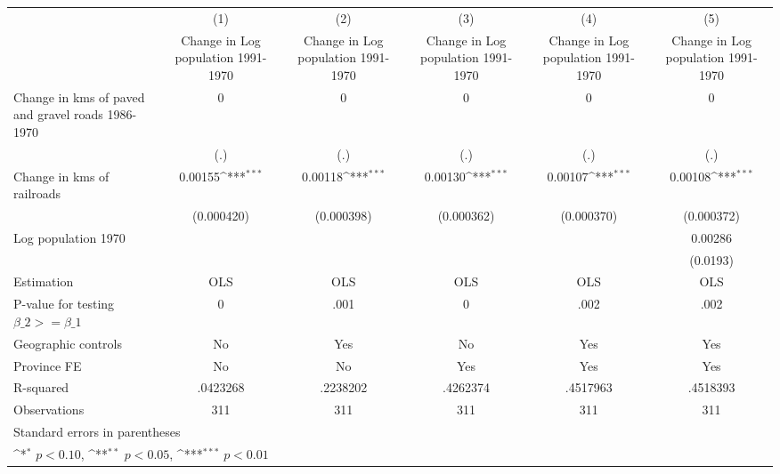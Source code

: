 {
\def\sym#1{\ifmmode^{#1}\else\(^{#1}\)\fi}
\begin{tabular}{l*{5}{c}}
\hline\hline
                    &\multicolumn{1}{c}{(1)}&\multicolumn{1}{c}{(2)}&\multicolumn{1}{c}{(3)}&\multicolumn{1}{c}{(4)}&\multicolumn{1}{c}{(5)}\\
                    &\multicolumn{1}{c}{Change in Log population 1991-1970}&\multicolumn{1}{c}{Change in Log population 1991-1970}&\multicolumn{1}{c}{Change in Log population 1991-1970}&\multicolumn{1}{c}{Change in Log population 1991-1970}&\multicolumn{1}{c}{Change in Log population 1991-1970}\\
\hline
Change in kms of paved and gravel roads 1986-1970&           0         &           0         &           0         &           0         &           0         \\
                    &         (.)         &         (.)         &         (.)         &         (.)         &         (.)         \\
[1em]
Change in kms of railroads&     0.00155\sym{***}&     0.00118\sym{***}&     0.00130\sym{***}&     0.00107\sym{***}&     0.00108\sym{***}\\
                    &  (0.000420)         &  (0.000398)         &  (0.000362)         &  (0.000370)         &  (0.000372)         \\
[1em]
Log population 1970 &                     &                     &                     &                     &     0.00286         \\
                    &                     &                     &                     &                     &    (0.0193)         \\
\hline
Estimation          &         OLS         &         OLS         &         OLS         &         OLS         &         OLS         \\
P-value for testing $\beta\_2 >= \beta\_1$&           0         &        .001         &           0         &        .002         &        .002         \\
Geographic controls &          No         &         Yes         &          No         &         Yes         &         Yes         \\
Province FE         &          No         &          No         &         Yes         &         Yes         &         Yes         \\
R-squared           &    .0423268         &    .2238202         &    .4262374         &    .4517963         &    .4518393         \\
Observations        &         311         &         311         &         311         &         311         &         311         \\
\hline\hline
\multicolumn{6}{l}{\footnotesize Standard errors in parentheses}\\
\multicolumn{6}{l}{\footnotesize \sym{*} \(p<0.10\), \sym{**} \(p<0.05\), \sym{***} \(p<0.01\)}\\
\end{tabular}
}
